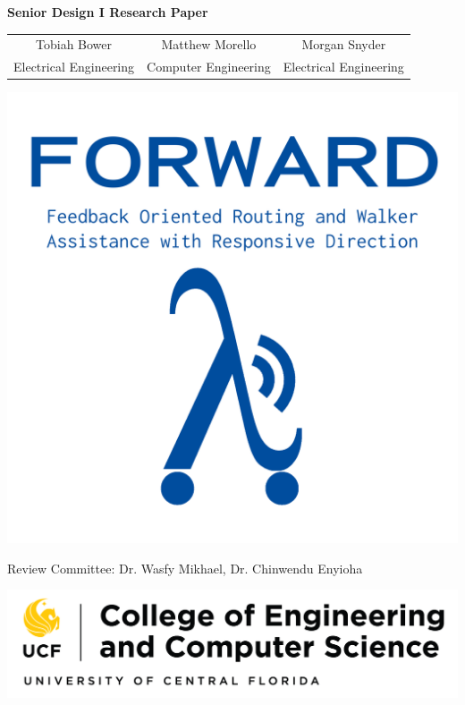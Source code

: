 \begin{titlepage}
	
	\thispagestyle{empty}
	
	\begin{center}
		\textbf{\Huge Senior Design I Research Paper} \\[\baselineskip]
		
		\begin{tabular}{c c c}
			{\large Tobiah Bower} & {\large Matthew Morello} & {\large Morgan Snyder} \\ 
			\small Electrical Engineering & \small Computer Engineering & \small Electrical Engineering
		\end{tabular}
	\end{center}
	
	\begin{center}
		\includegraphics[width=\textwidth]{./Images/FORWARD_logo_type_blue.png}
	\end{center}
	
	\begin{center}
		Review Committee: Dr. Wasfy Mikhael, Dr. Chinwendu Enyioha
	\end{center}
	
	\begin{center}
		\vspace{3\baselineskip} %
		\includegraphics[scale=0.4]{./Images/ucfece.png} %
	\end{center}
	
\end{titlepage}
